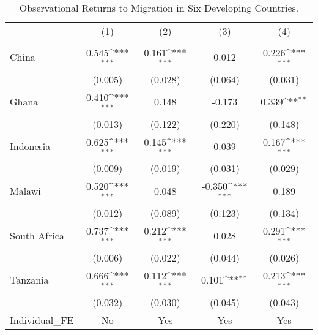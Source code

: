 \begin{table}[htbp]\centering
\def\sym#1{\ifmmode^{#1}\else\(^{#1}\)\fi}
\caption{Observational Returns to Migration in Six Developing Countries.}
\begin{tabular}{l*{4}{c}}
\toprule
                    &\multicolumn{1}{c}{(1)}&\multicolumn{1}{c}{(2)}&\multicolumn{1}{c}{(3)}&\multicolumn{1}{c}{(4)}\\
                    &\multicolumn{1}{c}{} &\multicolumn{1}{c}{} &\multicolumn{1}{c}{} &\multicolumn{1}{c}{} \\
\midrule
China               &       0.545\sym{***}&       0.161\sym{***}&       0.012         &       0.226\sym{***}\\
                    &     (0.005)         &     (0.028)         &     (0.064)         &     (0.031)         \\
\addlinespace
Ghana               &       0.410\sym{***}&       0.148         &      -0.173         &       0.339\sym{**} \\
                    &     (0.013)         &     (0.122)         &     (0.220)         &     (0.148)         \\
\addlinespace
Indonesia           &       0.625\sym{***}&       0.145\sym{***}&       0.039         &       0.167\sym{***}\\
                    &     (0.009)         &     (0.019)         &     (0.031)         &     (0.029)         \\
\addlinespace
Malawi              &       0.520\sym{***}&       0.048         &      -0.350\sym{***}&       0.189         \\
                    &     (0.012)         &     (0.089)         &     (0.123)         &     (0.134)         \\
\addlinespace
South Africa        &       0.737\sym{***}&       0.212\sym{***}&       0.028         &       0.291\sym{***}\\
                    &     (0.006)         &     (0.022)         &     (0.044)         &     (0.026)         \\
\addlinespace
Tanzania            &       0.666\sym{***}&       0.112\sym{***}&       0.101\sym{**} &       0.213\sym{***}\\
                    &     (0.032)         &     (0.030)         &     (0.045)         &     (0.043)         \\
\midrule
Individual\_FE       &          No         &         Yes         &         Yes         &         Yes         \\

\end{tabular}
\end{table}

